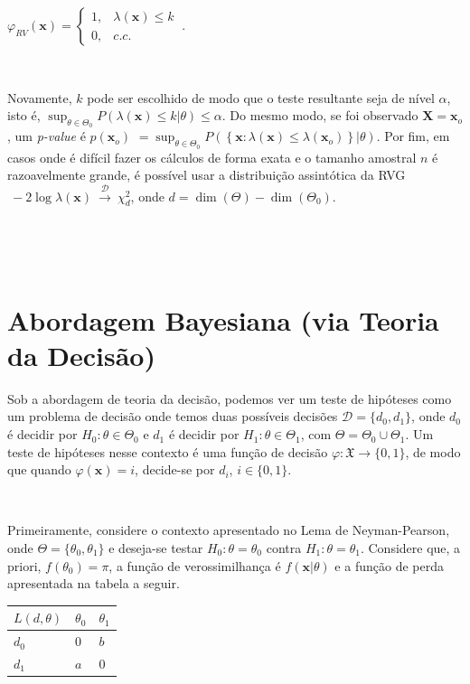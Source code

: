 \documentclass[
]{book}
\begin{document}
\({\varphi}_{RV}(\boldsymbol x)=\left\{\begin{array}{rl} 1,& \lambda(\boldsymbol x) \leq k\\ 0,& c.c.\end{array}\right.~.\)

\(~\)

Novamente, \(k\) pode ser escolhido de modo que o teste resultante seja de nível \(\alpha\), isto é, \(\displaystyle \sup_{\theta \in \Theta_0} P\left(\lambda(\boldsymbol x) \leq k \Big | \theta\right) \leq \alpha\). Do mesmo modo, se foi observado \(\boldsymbol X=\boldsymbol x_o\), um \emph{p-value} é \(p(\boldsymbol x_o)\) \(=\displaystyle \sup_{\theta \in \Theta_0}P\left(\left\{\boldsymbol x: \lambda(\boldsymbol x) \leq \lambda(\boldsymbol x_o)\right\}\big|\theta\right)\). Por fim, em casos onde é difícil fazer os cálculos de forma exata e o tamanho amostral \(n\) é razoavelmente grande, é possível usar a distribuição assintótica da RVG \(~-2\log \lambda(\boldsymbol x)\overset{\mathcal{D}}{~\longrightarrow~}\chi_d^2\), onde \(d=\dim(\Theta)-\dim(\Theta_0)\).

\(~\)

\(~\)

\hypertarget{abordagem-bayesiana-via-teoria-da-decisuxe3o}{%
\section{Abordagem Bayesiana (via Teoria da Decisão)}\label{abordagem-bayesiana-via-teoria-da-decisuxe3o}}

Sob a abordagem de teoria da decisão, podemos ver um teste de hipóteses como um problema de decisão onde temos duas possíveis decisões \(\mathcal{D}=\{d_0,d_1\}\), onde \(d_0\) é decidir por \(H_0:\theta \in \Theta_0\) e \(d_1\) é decidir por \(H_1:\theta \in \Theta_1\), com \(\Theta=\Theta_0\cup\Theta_1\). Um teste de hipóteses nesse contexto é uma função de decisão \(\varphi: \mathfrak{X} \longrightarrow \{0,1\}\), de modo que quando \(\varphi(\boldsymbol x)=i\), decide-se por \(d_i\), \(i\in \{0,1\}\).

\(~\)

Primeiramente, considere o contexto apresentado no Lema de Neyman-Pearson, onde \(\Theta=\{\theta_0,\theta_1\}\) e deseja-se testar \(H_0: \theta=\theta_0\) contra \(H_1: \theta = \theta_1\). Considere que, a priori, \(f(\theta_0) = \pi\), a função de verossimilhança é \(f(\boldsymbol x |\theta)\) e a função de perda apresentada na tabela a seguir.

\begin{tabular}{lll}
\toprule
$L(d,\theta)$ & $\theta_0$ & $\theta_1$\\
\midrule
$d_0$ & $0$ & $b$\\
$d_1$ & $a$ & $0$\\
\bottomrule
\end{tabular}
\end{document}
